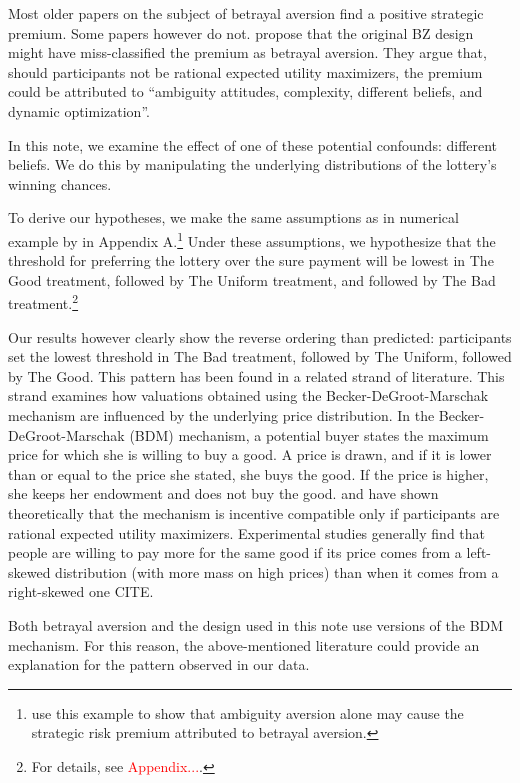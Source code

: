 Most older papers on the subject of betrayal aversion find a positive strategic premium.
Some papers however do not.
\cite{Li2020a} propose that the original BZ design might have miss-classified the premium as betrayal aversion.
They argue that, should participants not be rational expected utility maximizers, the premium could be attributed to ``ambiguity attitudes, complexity, different beliefs, and dynamic optimization''.

In this note, we examine the effect of one of these potential confounds: different beliefs.
We do this by manipulating the underlying distributions of the lottery's winning chances.

To derive our hypotheses, we make the same assumptions as in numerical example by \cite{Li2020a} in Appendix A.\footnote{
\cite{Li2020a} use this example to show that ambiguity aversion alone may cause the strategic risk premium attributed to betrayal aversion.
}
Under these assumptions, we hypothesize that the threshold for preferring the lottery over the sure payment will be lowest in The Good treatment, followed by The Uniform treatment, and followed by The Bad treatment.\footnote{
For details, see \textcolor{red}{Appendix...}.}

Our results however clearly show the reverse ordering than predicted: participants set the lowest threshold in The Bad treatment, followed by The Uniform, followed by The Good.
This pattern has been found in a related strand of literature.
This strand examines how valuations obtained using the Becker-DeGroot-Marschak mechanism \citep{Becker1964} are influenced by the underlying price distribution.
In the Becker-DeGroot-Marschak (BDM) mechanism, a potential buyer states the maximum price for which she is willing to buy a good.
A price is drawn, and if it is lower than or equal to the price she stated, she buys the good.
If the price is higher, she keeps her endowment and does not buy the good.
\cite{Karni1987} and \cite{Horowitz2006} have shown theoretically that the mechanism is incentive compatible only if participants are rational expected utility maximizers.
Experimental studies generally find that people are willing to pay more for the same good if its price comes from a left-skewed distribution (with more mass on high prices) than when it comes from a right-skewed one CITE.

Both betrayal aversion and the design used in this note use versions of the BDM mechanism.
For this reason, the above-mentioned literature could provide an explanation for the pattern observed in our data.


